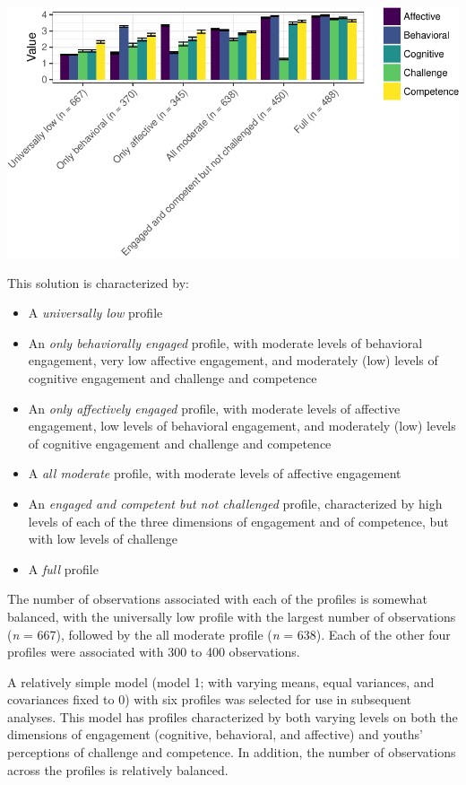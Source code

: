 \documentclass[]{book}
\providecommand{\tightlist}{%
  \setlength{\itemsep}{0pt}\setlength{\parskip}{0pt}}
\theoremstyle{definition}
\theoremstyle{definition}
\theoremstyle{definition}
\theoremstyle{remark}
\begin{document}
\begin{center}\includegraphics[width=1\linewidth]{rosenberg-dissertation_files/figure-latex/unnamed-chunk-10-2} \end{center}

This solution is characterized by:

\begin{itemize}
\tightlist
\item
  A \emph{universally low} profile
\item
  An \emph{only behaviorally engaged} profile, with moderate levels of
  behavioral engagement, very low affective engagement, and moderately
  (low) levels of cognitive engagement and challenge and competence
\item
  An \emph{only affectively engaged} profile, with moderate levels of
  affective engagement, low levels of behavioral engagement, and
  moderately (low) levels of cognitive engagement and challenge and
  competence
\item
  A \emph{all moderate} profile, with moderate levels of affective
  engagement
\item
  An \emph{engaged and competent but not challenged} profile,
  characterized by high levels of each of the three dimensions of
  engagement and of competence, but with low levels of challenge
\item
  A \emph{full} profile
\end{itemize}

The number of observations associated with each of the profiles is
somewhat balanced, with the universally low profile with the largest
number of observations (\emph{n} = 667), followed by the all moderate
profile (\emph{n} = 638). Each of the other four profiles were
associated with 300 to 400 observations.

A relatively simple model (model 1; with varying means, equal variances,
and covariances fixed to 0) with six profiles was selected for use in
subsequent analyses. This model has profiles characterized by both
varying levels on both the dimensions of engagement (cognitive,
behavioral, and affective) and youths' perceptions of challenge and
competence. In addition, the number of observations across the profiles
is relatively balanced.
\end{document}
